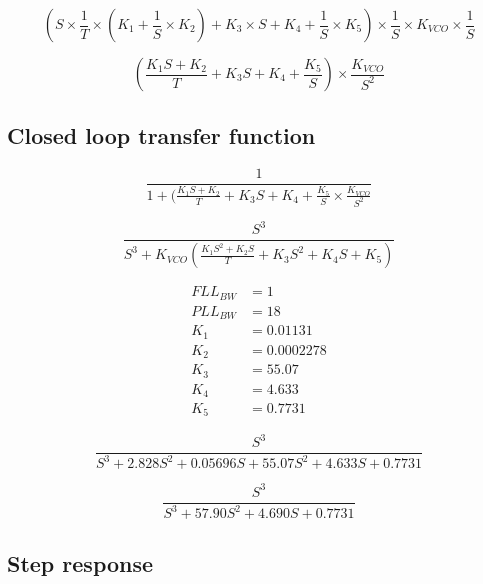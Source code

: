 \begin{equation}
(S \times \frac{1}{T} \times (K_1 + \frac{1}{S} \times K_2) + K_3 \times S + K_4 + \frac{1}{S} \times K_5) \times \frac{1}{S} \times K_{VCO} \times \frac{1}{S}
\end{equation}

\begin{equation}
(\frac{K_1 S + K_2}{T} + K_3  S + K_4 + \frac{K_5}{S} ) \times \frac{K_{VCO}}{S^2}
\end{equation}

\subsection{Closed loop transfer function}

\begin{comment}
PLL/FLL S^2 Ratio = 19.4
PLL/FLL S Ratio = 81.3339
\end{comment}

\begin{equation}
\frac{1}{1+(\frac{K_1 S + K_2}{T} + K_3  S +K_4  + \frac{K_5}{S}  \times \frac{K_{VCO}}{S^2}}
\end{equation}


\begin{equation}
\frac{S^3}{S^3 + K_{VCO}(\frac{K_1 S^2 + K_2 S}{T} + K_3 S^2 + K_4 S + K_5)}
\end{equation}

\begin{framed}
\begin{align}
FLL_{BW}&=1\\
PLL_{BW}&=18\\
K_1 &=  0.01131\\
K_2 &=  0.0002278\\
K_3 &= 55.07\\
K_4 &= 4.633\\
K_5 &= 0.7731
\end{align}
\end{framed}

\begin{equation}
\frac{S^3}{S^3 +2.828 S^2 + 0.05696 S + 55.07 S^2 + 4.633 S + 0.7731}
\end{equation}

\begin{equation}
\frac{S^3}{S^3 +57.90 S^2 + 4.690 S +0.7731}
\end{equation}

\subsection{Step response}

